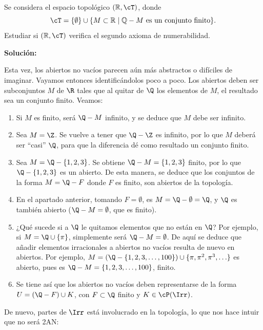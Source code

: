 \begin{ex}
    \label{Ejercicio:Rcof_irracionales}
    Se considera el espacio topológico \((\mathbb{R}, \cT)\), donde
    \[
        \cT = \{\emptyset\} \cup \{M \subset \mathbb{R} \mid \mathbb{Q} - M \text{ es un conjunto finito}\}.
    \]
    Estudiar si \((\mathbb{R}, \cT)\) verifica el segundo axioma de numerabilidad.

    \bigskip

    \textbf{Solución:}

    Esta vez, los abiertos no vacíos parecen aún más abstractos o difíciles de imaginar. Vayamos entonces identificándolos poco a poco. Los abiertos deben ser subconjuntos $M$ de $\R$ tales que al quitar de $\Q$ los elementos de $M$, el resultado sea un conjunto finito. Veamos:

    \begin{enumerate}[topsep=5pt, itemsep=0pt, label=--]
        \item Si $M$ es finito, será $\Q - M$ infinito, y se deduce que $M$ debe ser infinito.
        \item Sea $M = \Z$. Se vuelve a tener que $\Q - \Z$ es infinito, por lo que $M$ deberá ser ``casi'' $\Q$, para que la diferencia dé como resultado un conjunto finito.
        \item Sea $M = \Q - \{1,2,3\}$. Se obtiene $\Q - M = \{1,2,3\}$ finito, por lo que $\Q - \{1,2,3\}$ es un abierto. De esta manera, se deduce que los conjuntos de la forma $M = \Q - F$ donde $F$ es finito, son abiertos de la topología.
        \item En el apartado anterior, tomando $F = \emptyset$, es $M = \Q - \emptyset = \Q$, y $\Q$ es también abierto ($\Q - M = \emptyset$, que es finito).
        \item ¿Qué sucede si a $\Q$ le quitamos elementos que no están en $\Q$? Por ejemplo, si $M = \Q \cup \{\pi\}$, simplemente será $\Q - M = \emptyset$. De aquí se deduce que añadir elementos irracionales a abiertos no vacíos resulta de nuevo en abiertos. Por ejemplo, $M = (\Q - \{1,2,3, \ldots, 100\}) \cup \{\pi,\pi^2, \pi^3, \ldots\}$ es abierto, pues es $\Q - M = \{1,2,3, \ldots, 100\}$, finito.
        \item Se tiene así que los abiertos no vacíos deben representarse de la forma $U = (\Q - F) \cup K$, con $F \subset \Q$ finito y $K \in \cP(\Irr)$.
    \end{enumerate}

    De nuevo, partes de $\Irr$ está involucrado en la topología, lo que nos hace intuir que no será 2AN:


\end{ex}
